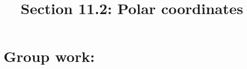 \documentclass[noinstructornotes]{ximera}
\title{Section 11.2: Polar coordinates}
\begin{document}
\begin{abstract}		\end{abstract}
\maketitle












\section{Group work:}
\end{document}
